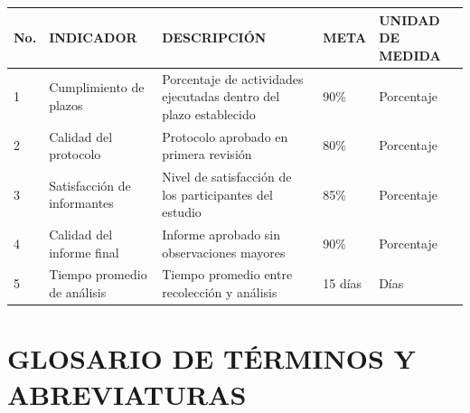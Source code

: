 \documentclass[12pt,a4paper]{article}
\begin{document}
\begin{longtable}{|C{0.8cm}|L{3cm}|L{4cm}|C{2.5cm}|C{2.5cm}|}
\hline
\textbf{No.} & \textbf{INDICADOR} & \textbf{DESCRIPCIÓN} & \textbf{META} & \textbf{UNIDAD DE MEDIDA} \\
\hline
\endhead

1 & Cumplimiento de plazos & Porcentaje de actividades ejecutadas dentro del plazo establecido & 90\% & Porcentaje \\
\hline

2 & Calidad del protocolo & Protocolo aprobado en primera revisión & 80\% & Porcentaje \\
\hline

3 & Satisfacción de informantes & Nivel de satisfacción de los participantes del estudio & 85\% & Porcentaje \\
\hline

4 & Calidad del informe final & Informe aprobado sin observaciones mayores & 90\% & Porcentaje \\
\hline

5 & Tiempo promedio de análisis & Tiempo promedio entre recolección y análisis & 15 días & Días \\
\hline

\end{longtable}

\section{GLOSARIO DE TÉRMINOS Y ABREVIATURAS}
\end{document}
